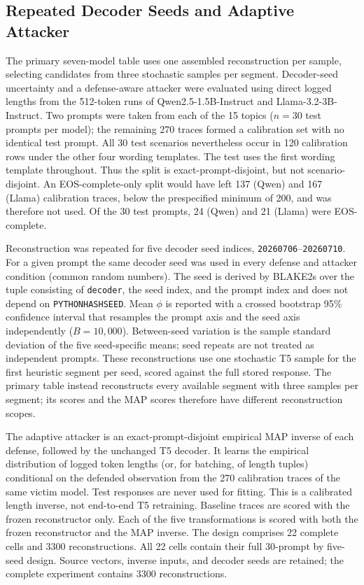 \documentclass[electronics,article,submit,pdftex,moreauthors]{Definitions/mdpi}
\begin{document}
\subsection{Repeated Decoder Seeds and Adaptive Attacker}\label{sec:robustness-methods}
The primary seven-model table uses one assembled reconstruction per sample, selecting candidates from three stochastic samples per segment. Decoder-seed uncertainty and a defense-aware attacker were evaluated using direct logged lengths from the 512-token runs of Qwen2.5-1.5B-Instruct and Llama-3.2-3B-Instruct. Two prompts were taken from each of the 15 topics ($n=30$ test prompts per model); the remaining 270 traces formed a calibration set with no identical test prompt. All 30 test scenarios nevertheless occur in 120 calibration rows under the other four wording templates. The test uses the first wording template throughout. Thus the split is exact-prompt-disjoint, but not scenario-disjoint. An EOS-complete-only split would have left 137 (Qwen) and 167 (Llama) calibration traces, below the prespecified minimum of 200, and was therefore not used. Of the 30 test prompts, 24 (Qwen) and 21 (Llama) were EOS-complete.

Reconstruction was repeated for five decoder seed indices, \texttt{20260706}--\texttt{20260710}. For a given prompt the same decoder seed was used in every defense and attacker condition (common random numbers). The seed is derived by BLAKE2s over the tuple consisting of \texttt{decoder}, the seed index, and the prompt index and does not depend on \texttt{PYTHONHASHSEED}. Mean $\phi$ is reported with a crossed bootstrap 95\% confidence interval that resamples the prompt axis and the seed axis independently ($B=10{,}000$). Between-seed variation is the sample standard deviation of the five seed-specific means; seed repeats are not treated as independent prompts. These reconstructions use one stochastic T5 sample for the first heuristic segment per seed, scored against the full stored response. The primary table instead reconstructs every available segment with three samples per segment; its scores and the MAP scores therefore have different reconstruction scopes.

The adaptive attacker is an exact-prompt-disjoint empirical MAP inverse of each defense, followed by the unchanged T5 decoder. It learns the empirical distribution of logged token lengths (or, for batching, of length tuples) conditional on the defended observation from the 270 calibration traces of the same victim model. Test responses are never used for fitting. This is a calibrated length inverse, not end-to-end T5 retraining. Baseline traces are scored with the frozen reconstructor only. Each of the five transformations is scored with both the frozen reconstructor and the MAP inverse. The design comprises 22 complete cells and 3300 reconstructions. All 22 cells contain their full 30-prompt by five-seed design. Source vectors, inverse inputs, and decoder seeds are retained; the complete experiment contains 3300 reconstructions.
\end{document}
